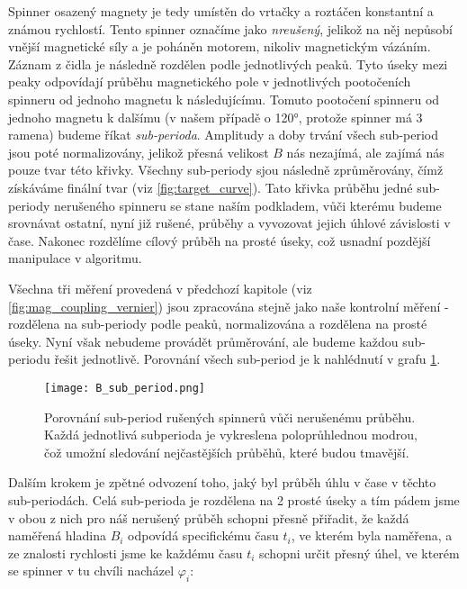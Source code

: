 Spinner osazený magnety je tedy umístěn do vrtačky a roztáčen konstantní a známou rychlostí. Tento spinner označíme jako \textit{nreušený}, jelikož na něj nepůsobí vnější magnetické síly a je poháněn motorem, nikoliv magnetickým vázáním. Záznam z čidla je následně rozdělen podle jednotlivých peaků. Tyto úseky mezi peaky odpovídají průběhu magnetického pole v jednotlivých pootočeních spinneru od jednoho magnetu k následujícímu. Tomuto pootočení spinneru od jednoho magnetu k dalšímu (v našem případě o 120°, protože spinner má 3 ramena) budeme říkat \textit{sub-perioda}. Amplitudy a doby trvání všech sub-period jsou poté normalizovány, jelikož přesná velikost $B$ nás nezajímá, ale zajímá nás pouze tvar této křivky. Všechny sub-periody sjou následně zprůměrovány, čímž získáváme finální tvar (viz \autoref{fig:target_curve}). Tato křivka průběhu jedné sub-periody nerušeného spinneru se stane naším podkladem, vůči kterému budeme srovnávat ostatní, nyní již rušené, průběhy a vyvozovat jejich úhlové závislosti v čase. Nakonec rozdělíme cílový průběh na prosté úseky, což usnadní pozdější manipulace v algoritmu.

Všechna tři měření provedená v předchozí kapitole (viz \autoref{fig:mag_coupling_vernier}) jsou zpracována stejně jako naše kontrolní měření - rozdělena na sub-periody podle peaků, normalizována a rozdělena na prosté úseky. Nyní však nebudeme provádět průměrování, ale budeme každou sub-periodu řešit jednotlivě. Porovnání všech sub-period je k nahlédnutí v grafu \ref{fig:B_sub_periods}.

\clearpage

\begin{figure}[H]
    \texttt{[image: B\_sub\_period.png]}
    \centering
    \caption[Porovnání sub-period rušených spinnerů vůči nerušenému průběhu]{Porovnání sub-period rušených spinnerů vůči nerušenému průběhu. Každá jednotlivá subperioda je vykreslena poloprůhlednou modrou, čož umožní sledování nejčastějších průběhů, které budou tmavější.}
    \label{fig:B_sub_periods}
\end{figure}

Dalším krokem je zpětné odvození toho, jaký byl průběh úhlu v čase v těchto sub-periodách. Celá sub-perioda je rozdělena na 2 prosté úseky a tím pádem jsme v obou z nich pro náš nerušený průběh schopni přesně přiřadit, že každá naměřená hladina $B_i$ odpovídá specifickému času $t_i$, ve kterém byla naměřena, a ze znalosti rychlosti jsme ke každému času $t_i$ schopni určit přesný úhel, ve kterém se spinner v tu chvíli nacházel $\varphi_i$:

